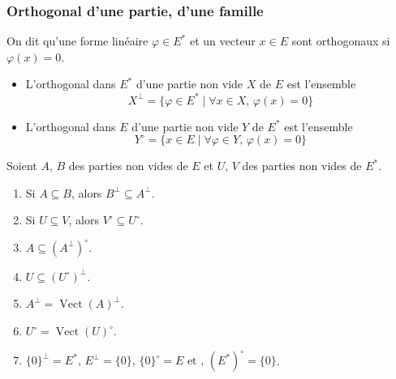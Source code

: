   \subsubsection{Orthogonal d'une partie, d'une famille}


  \begin{definition}
    On dit qu'une forme linéaire $\varphi \in E^*$ et un vecteur $x \in E$ sont orthogonaux si $\varphi(x) = 0$.
  \end{definition}

  \begin{definition}
    \begin{itemize}
      \item L'orthogonal dans $E^*$ d'une partie non vide $X$ de $E$ est l'ensemble
      \[ X^\perp = \{ \varphi \in E^* \mid \forall x \in X, \, \varphi(x) = 0 \} \]
      \item L'orthogonal dans $E$ d'une partie non vide $Y$ de $E^*$ est l'ensemble
      \[ Y^\circ = \{ x \in E \mid \forall \varphi \in Y, \, \varphi(x) = 0 \} \]
    \end{itemize}
  \end{definition}

  \begin{theorem}
    Soient $A$, $B$ des parties non vides de $E$ et $U$, $V$ des parties non vides de $E^*$.
    \begin{enumerate}[label={\bfseries(\roman*)}]
      \item Si $A \subseteq B$, alors $B^\perp \subseteq A^\perp$.
      \item Si $U \subseteq V$, alors $V^\circ \subseteq U^\circ$.
      \item $A \subseteq (A^\perp)^\circ$.
      \item $U \subseteq (U^\circ)^\perp$.
      \item $A^\perp = \operatorname{Vect}(A)^\perp$.
      \item $U^\circ = \operatorname{Vect}(U)^\circ$.
      \item $\{ 0 \}^\perp = E^*, \, E^\perp = \{ 0 \}, \, \{ 0 \}^\circ = E \text{ et }, \, (E^*)^\circ = \{ 0 \}$.
    \end{enumerate}
  \end{theorem}

